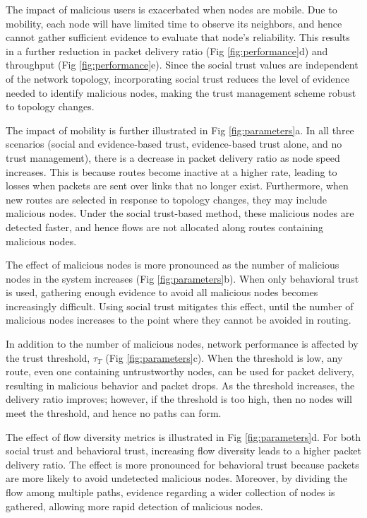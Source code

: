 \documentclass[conference]{IEEEtran}
\begin{document}
The impact of malicious users is exacerbated when nodes are mobile.  Due to mobility, each node will have limited time to observe its neighbors, and hence cannot gather sufficient evidence to evaluate that node's reliability.  This results in a further reduction in packet delivery ratio (Fig \ref{fig:performance}d) and throughput (Fig \ref{fig:performance}e).  Since the social trust values are independent of the network topology, incorporating social trust reduces the level of evidence needed to identify malicious nodes, making the trust management scheme robust to topology changes.




The impact of mobility is further illustrated in Fig \ref{fig:parameters}a. In all three scenarios (social and evidence-based trust, evidence-based trust alone, and no trust management), there is a decrease in packet delivery ratio as node speed increases.  This is because routes become inactive at a higher rate, leading to losses when packets are sent over links that no longer exist.  Furthermore, when new routes are selected in response to topology changes, they may include malicious nodes.  Under the social trust-based method, these malicious nodes are detected faster, and hence flows are not allocated along routes containing malicious nodes.



The effect of malicious nodes is more pronounced as the number of malicious nodes in the system increases (Fig \ref{fig:parameters}b).  When only behavioral trust is used, gathering enough evidence to avoid all malicious nodes becomes increasingly difficult.  Using social trust mitigates this effect, until the number of malicious nodes increases to the point where they cannot be avoided in routing.



In addition to the number of malicious nodes, network performance is affected by the trust threshold, $\tau_{T}$ (Fig \ref{fig:parameters}c). When the threshold is low, any route, even one containing untrustworthy nodes, can be used for packet delivery, resulting in malicious behavior and packet drops. As the threshold increases, the delivery ratio improves; however, if the threshold is too high, then no nodes will meet the threshold, and hence no paths can form.



The effect of flow diversity metrics is illustrated in Fig \ref{fig:parameters}d.  For both social trust and behavioral trust, increasing flow diversity leads to a higher packet delivery ratio.  The effect is more pronounced for behavioral trust because packets are more likely to avoid undetected malicious nodes.  Moreover, by dividing the flow among multiple paths, evidence regarding a wider collection of nodes is gathered, allowing more rapid detection of malicious nodes.
\end{document}
